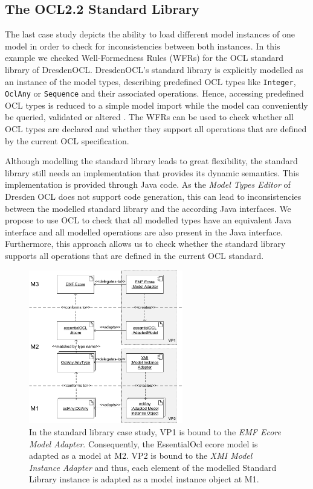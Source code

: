 \subsection{The OCL2.2 Standard Library}
The last case study depicts the ability to load different model instances of one model 
in order to check for inconsistencies between both instances. In this example we 
checked Well-Formedness Rules (WFRs) for the OCL standard library of DresdenOCL. 
DresdenOCL's standard library is explicitly modelled as 
an instance of the model types, describing predefined OCL types like \texttt{Integer}, 
\texttt{OclAny} or \texttt{Sequence} and their associated operations. 
Hence, accessing predefined OCL types is reduced to a simple model 
import while the model can conveniently be queried, validated or altered 
\cite{braeuerOCL07}. The WFRs can be used to check whether all OCL types are 
declared and whether they support all operations that are defined by the 
current OCL specification.

Although modelling the standard library leads to great flexibility, the standard library 
still needs an implementation that provides its dynamic semantics. 
This implementation is provided through Java code. As the \textit{Model Types Editor} of Dresden OCL
does not support code generation, this can lead to inconsistencies between 
the modelled standard library and the according Java interfaces.
We propose to use OCL to check that all modelled types have an equivalent Java 
interface and all modelled operations are also present in the Java interface. Furthermore, 
this approach allows us to check whether the standard library supports all operations that 
are defined in the current OCL standard.

\begin{figure}[!t]
	\centering
		\includegraphics[width=0.60\textwidth]{figures/casestudy03.pdf}
	\caption{ 
	In the standard library case study, VP1 is bound to the \textit{EMF Ecore Model Adapter}. 
	  Consequently, the EssentialOcl ecore model is adapted as a model at M2.
	  VP2 is bound to the \textit{XMI Model Instance Adapter} and thus, each element of the modelled Standard Library
	  instance is adapted as a model instance object at M1.}
	\label{fig:casestudy03}
\end{figure}

